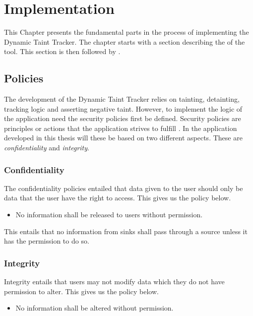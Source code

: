 \chapter{Implementation}
This Chapter presents the fundamental parts in the process of implementing the Dynamic Taint Tracker. The chapter starts with a section describing the \textit{} of the tool. This section is then followed by \textit{}.



\section{Policies}
\label{Policies}
The development of the Dynamic Taint Tracker relies on tainting, detainting, tracking logic and asserting negative taint. However, to implement the logic of the application need the security policies first be defined. Security policies are principles or actions that the application strives to fulfill \parencite{BayukJenniferL2012Cspg}. In the application developed in this thesis will these be based on two different aspects. These are \textit{confidentiality} and \textit{integrity}.



\subsection{Confidentiality}
The confidentiality policies entailed that data given to the user should only be data that the user have the right to access. This gives us the policy below.

\hfill
\begin{itemize}
    \item No information shall be released to users without permission.
\end{itemize}
\hfill

This entails that no information from sinks shall pass through a source unless it has the permission to do so.



\subsection{Integrity}
Integrity entails that users may not modify data which they do not have permission to alter. This gives us the policy below.

\hfill
\begin{itemize}
    \item No information shall be altered without permission.
\end{itemize}
\hfill

